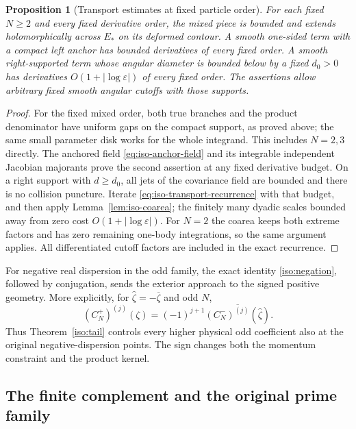 \documentclass[11pt]{article}
\numberwithin{equation}{section}
\newtheorem{proposition}[theorem]{Proposition}
\theoremstyle{definition}
\newcommand{\eps}{\varepsilon}
\begin{document}
\begin{proposition}[Transport estimates at fixed particle order]
\label{prop:iso-finite-transport}
For each fixed $N\ge2$ and every fixed derivative order, the mixed
piece is bounded and extends holomorphically across
${E}_*$ on its deformed contour.  A smooth one-sided term with
a compact left anchor has bounded derivatives of every fixed order.
A smooth right-supported term whose angular diameter is bounded
below by a fixed $d_0>0$ has derivatives
$O(1+|\log\eps|)$ of every fixed order.  The assertions allow
arbitrary fixed smooth angular cutoffs with those supports.
\end{proposition}
\begin{proof}
For the fixed mixed order, both true branches and the product
denominator have uniform gaps on the compact support, as proved
above; the same small parameter disk works for the whole integrand.
This includes $N=2,3$ directly.  The anchored field
\eqref{eq:iso-anchor-field} and its integrable independent Jacobian
majorants prove the second assertion at any fixed derivative budget.
On a right support with $d\ge d_0$, all jets of the covariance
field are bounded and there is no collision puncture.  Iterate
\eqref{eq:iso-transport-recurrence} with that budget, and then apply
Lemma~\ref{lem:iso-coarea}; the finitely many dyadic scales bounded
away from zero cost $O(1+|\log\eps|)$.  For $N=2$ the coarea keeps
both extreme factors and has zero remaining one-body integrations,
so the same argument applies.  All differentiated cutoff factors
are included in the exact recurrence.
\end{proof}



For negative real dispersion in the odd family, the exact identity
\eqref{iso:negation}, followed by conjugation, sends the exterior
approach to the signed positive geometry. More explicitly, for
$\widehat\zeta=-\overline\zeta$ and odd $N$,
\[
 (C_N^+)^{(j)}(\zeta)
   =(-1)^{j+1}\overline{(C_N^-)^{(j)}(\widehat\zeta)}.
\]
Thus Theorem~\ref{iso:tail} controls every higher physical odd
coefficient also at the original negative-dispersion points.
The sign changes both the momentum constraint and the product kernel.

\subsection{The finite complement and the original prime family}
\end{document}
